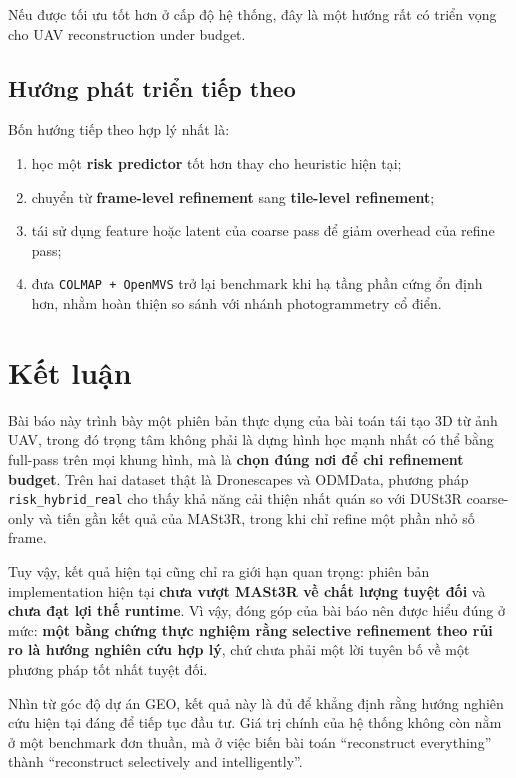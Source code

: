 \documentclass[11pt,a4paper]{article}
\begin{document}
Nếu được tối ưu tốt hơn ở cấp độ hệ thống, đây là một hướng rất có triển vọng cho UAV reconstruction under budget.

\subsection{Hướng phát triển tiếp theo}

Bốn hướng tiếp theo hợp lý nhất là:
\begin{enumerate}[leftmargin=1.5em]
  \item học một \textbf{risk predictor} tốt hơn thay cho heuristic hiện tại;
  \item chuyển từ \textbf{frame-level refinement} sang \textbf{tile-level refinement};
  \item tái sử dụng feature hoặc latent của coarse pass để giảm overhead của refine pass;
  \item đưa \texttt{COLMAP + OpenMVS} trở lại benchmark khi hạ tầng phần cứng ổn định hơn, nhằm hoàn thiện so sánh với nhánh photogrammetry cổ điển.
\end{enumerate}

\section{Kết luận}

Bài báo này trình bày một phiên bản thực dụng của bài toán tái tạo 3D từ ảnh UAV, trong đó trọng tâm không phải là dựng hình học mạnh nhất có thể bằng full-pass trên mọi khung hình, mà là \textbf{chọn đúng nơi để chi refinement budget}. Trên hai dataset thật là Dronescapes và ODMData, phương pháp \texttt{risk\_hybrid\_real} cho thấy khả năng cải thiện nhất quán so với DUSt3R coarse-only và tiến gần kết quả của MASt3R, trong khi chỉ refine một phần nhỏ số frame.

Tuy vậy, kết quả hiện tại cũng chỉ ra giới hạn quan trọng: phiên bản implementation hiện tại \textbf{chưa vượt MASt3R về chất lượng tuyệt đối} và \textbf{chưa đạt lợi thế runtime}. Vì vậy, đóng góp của bài báo nên được hiểu đúng ở mức: \textbf{một bằng chứng thực nghiệm rằng selective refinement theo rủi ro là hướng nghiên cứu hợp lý}, chứ chưa phải một lời tuyên bố về một phương pháp tốt nhất tuyệt đối.

Nhìn từ góc độ dự án GEO, kết quả này là đủ để khẳng định rằng hướng nghiên cứu hiện tại đáng để tiếp tục đầu tư. Giá trị chính của hệ thống không còn nằm ở một benchmark đơn thuần, mà ở việc biến bài toán ``reconstruct everything'' thành ``reconstruct selectively and intelligently''.

\nocite{Zhao2014Direct,Zheng2018multi,Wu2018Integration,Zhang2020UAV,Yu2021Automatic,Xu2021Robust,Chen2024End,Tong2024Large,Wu2024evaluation,Shi2025Accurate}



\end{document}

